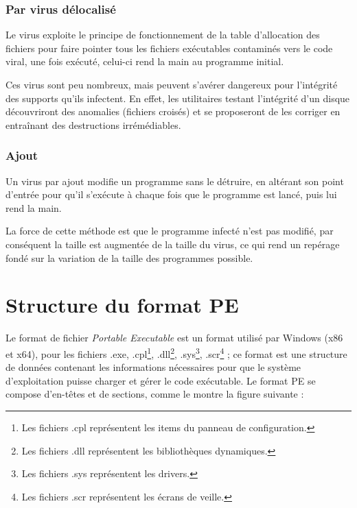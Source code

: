         \subsubsection{Par virus délocalisé}
        Le virus exploite le principe de fonctionnement de la table d'allocation des fichiers pour faire pointer 
        tous les fichiers exécutables contaminés vers le code viral, une fois exécuté, celui-ci rend 
        la main au programme initial.\cite{virus_informatique_article} %

        Ces virus sont peu nombreux, mais peuvent s’avérer dangereux pour l’intégrité des supports qu’ils infectent. 
        En effet, les utilitaires testant l’intégrité d’un disque découvriront des anomalies (fichiers croisés) 
        et se proposeront de les corriger en entraînant des destructions irrémédiables. %

        \subsubsection{Ajout} \label{infeciton_ajout}
        Un virus par ajout modifie un programme sans le détruire, en altérant son point d’entrée pour 
        qu’il s'exécute à chaque fois que le programme est lancé, puis lui rend la main. %

        La force de cette méthode est que le programme infecté n’est pas modifié, par conséquent la taille 
        est augmentée de la taille du virus, ce qui rend un repérage fondé sur la variation de 
        la taille des programmes possible. \cite{virus_informatique_article}%

\section{Structure du format PE} \label{pe_header}
Le format de fichier \emph{Portable Executable} \cite{pe1} est un format utilisé par Windows (x86 et x64), 
pour les fichiers .exe, .cpl\footnote{Les fichiers .cpl représentent les items du panneau de configuration.}, 
.dll\footnote{Les fichiers .dll représentent les bibliothèques dynamiques.}, 
.sys\footnote{Les fichiers .sys représentent les drivers.}, 
.scr\footnote{Les fichiers .scr représentent les écrans de veille.} ;
ce format est une structure de données contenant les 
informations nécessaires pour que le système d’exploitation puisse charger et gérer le code 
exécutable. Le format PE se compose d'en-têtes et de sections, comme le montre la figure suivante : %

